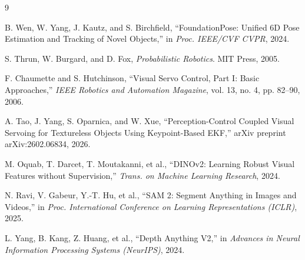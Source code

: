 \documentclass[letterpaper, 10 pt, conference]{ieeeconf}  %
\begin{document}
\begin{thebibliography}{9}

 B. Wen, W. Yang, J. Kautz, and S. Birchfield, ``FoundationPose: Unified 6D Pose Estimation and Tracking of Novel Objects,'' in \textit{Proc. IEEE/CVF CVPR}, 2024.

 S. Thrun, W. Burgard, and D. Fox, \textit{Probabilistic Robotics}. MIT Press, 2005.

 F. Chaumette and S. Hutchinson, ``Visual Servo Control, Part I: Basic Approaches,'' \textit{IEEE Robotics and Automation Magazine}, vol. 13, no. 4, pp. 82--90, 2006.

A. Tao, J. Yang, S. Oparnica, and W. Xue, ``Perception-Control Coupled Visual Servoing for Textureless Objects Using Keypoint-Based EKF,'' arXiv preprint arXiv:2602.06834, 2026.

M. Oquab, T. Darcet, T. Moutakanni, et al., ``DINOv2: Learning Robust Visual Features without Supervision,'' \textit{Trans. on Machine Learning Research}, 2024.

N. Ravi, V. Gabeur, Y.-T. Hu, et al., ``SAM 2: Segment Anything in Images and Videos,'' in \textit{Proc. International Conference on Learning Representations (ICLR)}, 2025.

L. Yang, B. Kang, Z. Huang, et al., ``Depth Anything V2,'' in \textit{Advances in Neural Information Processing Systems (NeurIPS)}, 2024.

\end{thebibliography}
\end{document}
